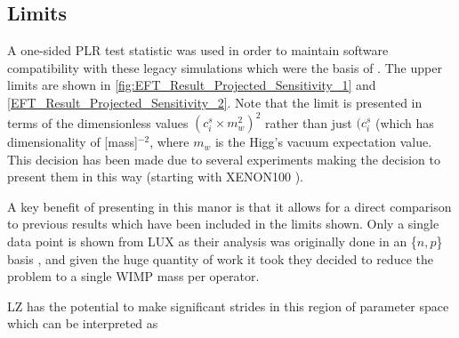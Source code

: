 \subsection{Limits}
\par
A one-sided PLR test statistic was used in order to maintain software compatibility with these legacy simulations which were the basis of \cite{LZ_projected_sensitivity_paper_ref}.
The upper limits are shown in \autoref{fig:EFT_Result_Projected_Sensitivity_1} and \autoref{EFT_Result_Projected_Sensitivity_2}.
Note that the limit is presented in terms of the dimensionless values $({c}^{s}_{i}\times{m}^{2}_{w})^{2}$ rather than just $({c}^{s}_{i}$ (which has dimensionality of [mass]$^{-2}$, where $m_w$ is the Higg's vacuum expectation value.
This decision has been made due to several experiments making the decision to present them in this way (starting with XENON100 \cite{xenon100_eft_ref}).
\par
A key benefit of presenting in this manor is that it allows for a direct comparison to previous results which have been included in the limits shown.
Only a single data point is shown from LUX as their analysis was originally done in an \{$n,p$\} basis \cite{LUX_RUN4_EFT_2021}, and given the huge quantity of work it took they decided to reduce the problem to a single WIMP mass per operator.
\par
LZ has the potential to make significant strides in this region of parameter space which can be interpreted as 


